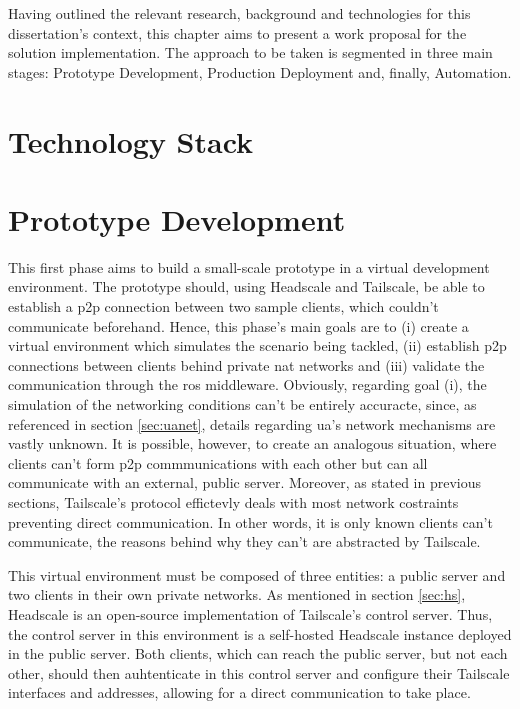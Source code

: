 \documentclass[11pt,twoside,a4paper]{report}
\begin{document}
Having outlined the relevant research, background and technologies for this dissertation's context, this chapter aims to present a work proposal for the solution implementation. The approach to be taken is segmented in three main stages: Prototype Development, Production Deployment and, finally, Automation.

\section{Technology Stack}

\section{Prototype Development}
\label{sec:protodev}

This first phase aims to build a small-scale prototype in a virtual development environment. The prototype should, using Headscale and Tailscale, be able to establish a \ac{p2p} connection between two sample clients, which couldn't communicate beforehand. Hence, this phase's main goals are to (i) create a virtual environment which simulates the scenario being tackled, (ii) establish \ac{p2p} connections between clients behind private \ac{nat} networks  and (iii) validate the communication through the \ac{ros} middleware. Obviously, regarding goal (i), the simulation of the networking conditions can't be entirely accuracte, since, as referenced in section \ref{sec:uanet}, details regarding \ac{ua}'s network mechanisms are vastly unknown. It is possible, however, to create an analogous situation, where clients can't form \ac{p2p} commmunications with each other but can all communicate with an external, public server. Moreover, as stated in previous sections, Tailscale's protocol effictevly deals with most network costraints preventing direct communication. In other words, it is only known clients can't communicate, the reasons behind why they can't are abstracted by Tailscale.

This virtual environment must be composed of three entities: a public server and two clients in their own private networks. As mentioned in section \ref{sec:hs}, Headscale is an open-source implementation of Tailscale's control server. Thus, the control server in this environment is a self-hosted Headscale instance deployed in the public server. Both clients, which can reach the public server, but not each other, should then auhtenticate in this control server and configure their Tailscale interfaces and addresses, allowing for a direct communication to take place.
\end{document}
